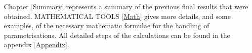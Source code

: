 Chapter \ref{Summary} represents  a  summary  of  the  previous final results  that  were  obtained. MATHEMATICAL TOOLS \ref{Math} gives more details, and some examples, of the necessary mathematic formulae for the handling of parametrisations. All detailed steps of the calculations can be found in the appendix \ref{Appendix}.

 